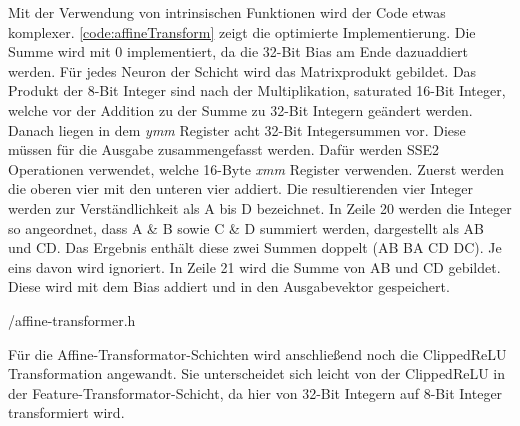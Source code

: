 Mit der Verwendung von intrinsischen Funktionen wird der Code etwas komplexer. \autoref{code:affineTransform} zeigt die optimierte Implementierung. Die Summe wird mit 0 implementiert, da die 32-Bit Bias am Ende dazuaddiert werden. Für jedes Neuron der Schicht wird das Matrixprodukt gebildet. Das Produkt der 8-Bit Integer sind nach der Multiplikation, saturated 16-Bit Integer, welche vor der Addition zu der Summe zu 32-Bit Integern geändert werden. Danach liegen in dem \emph{ymm} Register acht 32-Bit Integersummen vor. Diese müssen für die Ausgabe zusammengefasst werden. Dafür werden \ac{SSE2} Operationen verwendet, welche 16-Byte \emph{xmm} Register verwenden. Zuerst werden die oberen vier mit den unteren vier addiert. Die resultierenden vier Integer werden zur Verständlichkeit als A bis D bezeichnet. In Zeile 20 werden die Integer so angeordnet, dass A \& B sowie C \& D summiert werden, dargestellt als AB und CD. Das Ergebnis enthält diese zwei Summen doppelt (AB BA CD DC). Je eins davon wird ignoriert. In Zeile 21 wird die Summe von AB und CD gebildet. Diese wird mit dem Bias addiert und in den Ausgabevektor gespeichert.


{\srcloc/affine-transformer.h}

Für die Affine-Transformator-Schichten wird anschließend noch die Clipped\ac{ReLU} Transformation angewandt. Sie unterscheidet sich leicht von der Clipped\ac{ReLU} in der Feature-Transformator-Schicht, da hier von 32-Bit Integern auf 8-Bit Integer transformiert wird.